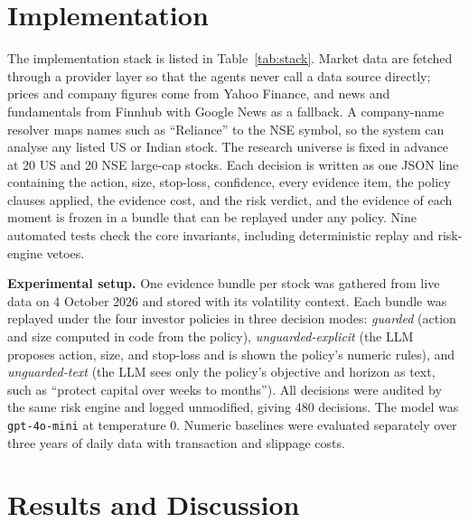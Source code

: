 \section{Implementation}
The implementation stack is listed in Table~\ref{tab:stack}. Market data are fetched through a provider layer so that the agents never call a data source directly; prices and company figures come from Yahoo Finance, and news and fundamentals from Finnhub with Google News as a fallback. A company-name resolver maps names such as ``Reliance'' to the NSE symbol, so the system can analyse any listed US or Indian stock. The research universe is fixed in advance at 20 US and 20 NSE large-cap stocks. Each decision is written as one JSON line containing the action, size, stop-loss, confidence, every evidence item, the policy clauses applied, the evidence cost, and the risk verdict, and the evidence of each moment is frozen in a bundle that can be replayed under any policy. Nine automated tests check the core invariants, including deterministic replay and risk-engine vetoes.

\StackTable

\textbf{Experimental setup.} One evidence bundle per stock was gathered from live data on 4 October 2026 and stored with its volatility context. Each bundle was replayed under the four investor policies in three decision modes: \emph{guarded} (action and size computed in code from the policy), \emph{unguarded-explicit} (the LLM proposes action, size, and stop-loss and is shown the policy's numeric rules), and \emph{unguarded-text} (the LLM sees only the policy's objective and horizon as text, such as ``protect capital over weeks to months''). All decisions were audited by the same risk engine and logged unmodified, giving 480 decisions. The model was \texttt{gpt-4o-mini} at temperature 0. Numeric baselines were evaluated separately over three years of daily data with transaction and slippage costs.

\section{Results and Discussion}
